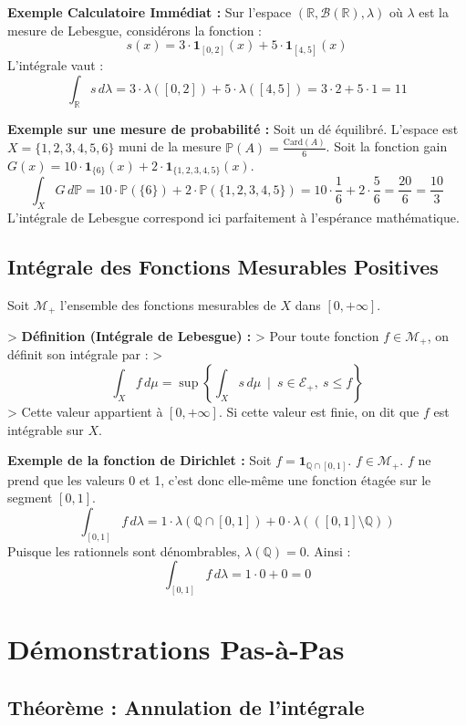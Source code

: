 \documentclass[11pt,a4paper]{article}
\begin{document}
\textbf{Exemple Calculatoire Immédiat :}
Sur l'espace $(\mathbb{R}, \mathcal{B}(\mathbb{R}), \lambda)$ où $\lambda$ est la mesure de Lebesgue, considérons la fonction :
$$s(x) = 3 \cdot \mathbf{1}_{[0, 2]}(x) + 5 \cdot \mathbf{1}_{[4, 5]}(x)$$
L'intégrale vaut :
$$\int_{\mathbb{R}} s \, d\lambda = 3 \cdot \lambda([0, 2]) + 5 \cdot \lambda([4, 5]) = 3 \cdot 2 + 5 \cdot 1 = 11$$

\textbf{Exemple sur une mesure de probabilité :}
Soit un dé équilibré. L'espace est $X = \{1, 2, 3, 4, 5, 6\}$ muni de la mesure $\mathbb{P}(A) = \frac{\text{Card}(A)}{6}$.
Soit la fonction gain $G(x) = 10 \cdot \mathbf{1}_{\{6\}}(x) + 2 \cdot \mathbf{1}_{\{1,2,3,4,5\}}(x)$.
$$\int_X G \, d\mathbb{P} = 10 \cdot \mathbb{P}(\{6\}) + 2 \cdot \mathbb{P}(\{1,2,3,4,5\}) = 10 \cdot \frac{1}{6} + 2 \cdot \frac{5}{6} = \frac{20}{6} = \frac{10}{3}$$
L'intégrale de Lebesgue correspond ici parfaitement à l'espérance mathématique.

\subsection{Intégrale des Fonctions Mesurables Positives}

Soit $\mathcal{M}_+$ l'ensemble des fonctions mesurables de $X$ dans $[0, +\infty]$.

> \textbf{Définition (Intégrale de Lebesgue) :}
> Pour toute fonction $f \in \mathcal{M}_+$, on définit son intégrale par :
> $$\int_X f \, d\mu = \sup \left\lbrace \int_X s \, d\mu \ \mid \ s \in \mathcal{E}_+, \ s \le f \right\rbrace$$
> Cette valeur appartient à $[0, +\infty]$. Si cette valeur est finie, on dit que $f$ est intégrable sur $X$.

\textbf{Exemple de la fonction de Dirichlet :}
Soit $f = \mathbf{1}_{\mathbb{Q} \cap [0,1]}$. $f \in \mathcal{M}_+$.
$f$ ne prend que les valeurs 0 et 1, c'est donc elle-même une fonction étagée sur le segment $[0, 1]$.
$$\int_{[0,1]} f \, d\lambda = 1 \cdot \lambda(\mathbb{Q} \cap [0,1]) + 0 \cdot \lambda(([0,1] \setminus \mathbb{Q}))$$
Puisque les rationnels sont dénombrables, $\lambda(\mathbb{Q}) = 0$. Ainsi :
$$\int_{[0,1]} f \, d\lambda = 1 \cdot 0 + 0 = 0$$

\section{Démonstrations Pas-à-Pas}

\subsection{Théorème : Annulation de l'intégrale}
\end{document}
